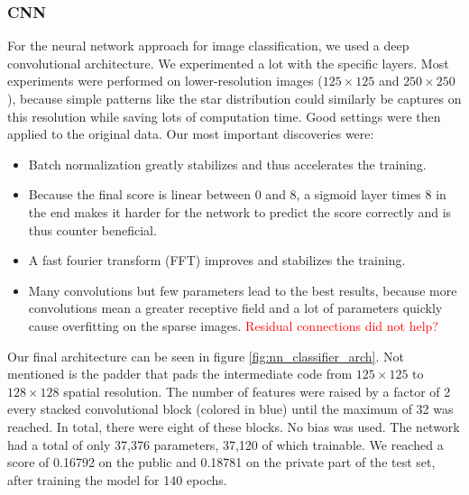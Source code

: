 \documentclass[10pt,conference,compsocconf]{IEEEtran}
\newcommand\TODO[1]{\textcolor{red}{#1}} %
\begin{document}
\subsubsection{CNN} %
For the neural network approach for image classification, we used a deep convolutional architecture. We experimented a lot with the specific layers. Most experiments were performed on lower-resolution images ($125\times125$ and $250\times250$), because simple patterns like the star distribution could similarly be captures on this resolution while saving lots of computation time. Good settings were then applied to the original data. Our most important discoveries were:
\begin{itemize}
    \item Batch normalization greatly stabilizes and thus accelerates the training.
    \item Because the final score is linear between 0 and 8, a sigmoid layer times 8 in the end makes it harder for the network to predict the score correctly and is thus counter beneficial.
    \item A fast fourier transform (FFT) improves and stabilizes the training.
    \item Many convolutions but few parameters lead to the best results, because more convolutions mean a greater receptive field and a lot of parameters quickly cause overfitting on the sparse images.
    \TODO{Residual connections did not help?}
\end{itemize}
Our final architecture can be seen in figure \ref{fig:nn_classifier_arch}.  Not mentioned is the padder that pads the intermediate code from $125\times125$ to $128\times128$ spatial resolution. The number of features were raised by a factor of 2 every stacked convolutional block (colored in blue) until the maximum of 32 was reached. In total, there were eight of these blocks. No bias was used. The network had a total of only 37,376 parameters, 37,120 of which trainable. We reached a score of 0.16792 on the public and 0.18781 on the private part of the test set, after training the model for 140 epochs.
\end{document}
